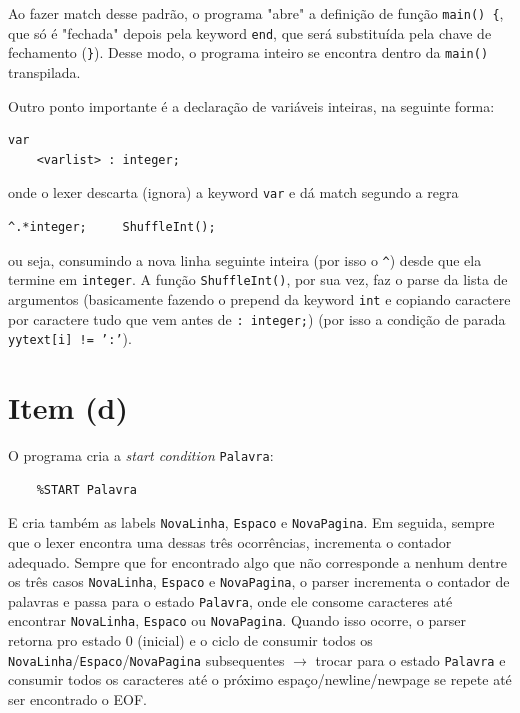 \documentclass{article}
\begin{document}
Ao fazer match desse padrão, o programa "abre" a definição de função \texttt{main() \{}, que só é "fechada" depois pela keyword \texttt{end}, que será substituída pela chave de fechamento (\texttt{\}}). Desse modo, o programa inteiro se encontra dentro da \texttt{main()} transpilada.

Outro ponto importante é a declaração de variáveis inteiras, na seguinte forma:

\begin{verbatim}
var
    <varlist> : integer;
\end{verbatim}

onde o lexer descarta (ignora) a keyword \texttt{var} e dá match segundo a regra

\begin{verbatim}
^.*integer;     ShuffleInt();
\end{verbatim}

ou seja, consumindo a nova linha seguinte inteira (por isso o \texttt{\textasciicircum}) desde que ela termine em \texttt{integer}. A função \texttt{ShuffleInt()}, por sua vez, faz o parse da lista de argumentos (basicamente fazendo o prepend da keyword \texttt{int} e copiando caractere por caractere tudo que vem antes de \texttt{: integer;}) (por isso a condição de parada \texttt{yytext[i] != ':'}).

\newpage
\section*{Item (d)}

O programa cria a \textit{start condition} \texttt{Palavra}:

\begin{verbatim}
    %START Palavra
\end{verbatim}

E cria também as labels \texttt{NovaLinha}, \texttt{Espaco} e \texttt{NovaPagina}. Em seguida, sempre que o lexer encontra uma dessas três ocorrências, incrementa o contador adequado. 
Sempre que for encontrado algo que não corresponde a nenhum dentre os três casos \texttt{NovaLinha}, \texttt{Espaco} e \texttt{NovaPagina}, o parser incrementa o contador de palavras e passa para o estado \texttt{Palavra}, onde ele consome caracteres até encontrar \texttt{NovaLinha}, \texttt{Espaco} ou \texttt{NovaPagina}.
Quando isso ocorre, o parser retorna pro estado 0 (inicial) e o ciclo de consumir todos os \texttt{NovaLinha}/\texttt{Espaco}/\texttt{NovaPagina} subsequentes $\rightarrow$ trocar para o estado \texttt{Palavra} e consumir todos os caracteres até o próximo espaço/newline/newpage se repete até ser encontrado o EOF.
\end{document}

